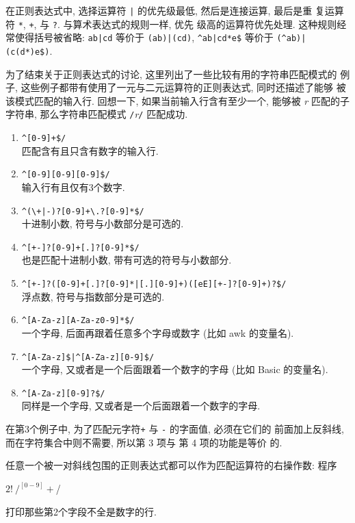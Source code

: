 在正则表达式中, 选择运算符 \verb'|' 的优先级最低, 然后是连接运算, 最后是重
复运算符 \verb'*', \verb'+', 与 \verb'?'. 与算术表达式的规则一样, 优先
级高的运算符优先处理. 这种规则经常使得括号被省略: \verb'ab|cd' 等价于
\verb'(ab)|(cd)', \verb'^ab|cd*e$' 等价于 \verb'(^ab)|(c(d*)e$)'.

为了结束关于正则表达式的讨论, 这里列出了一些比较有用的字符串匹配模式的
例子, 这些例子都带有使用了一元与二元运算符的正则表达式, 同时还描述了能够
被该模式匹配的输入行. 回想一下, 如果当前输入行含有至少一个, 能够被
\textit{r} 匹配的子字符串, 那么字符串匹配模式 \verb'/'\textit{r}\verb'/'
匹配成功.
\begin{enumerate}
\item \verb'^[0-9]+$/' \\
    匹配含有且只含有数字的输入行.
\item \verb'^[0-9][0-9][0-9]$/' \\
    输入行有且仅有3个数字.
\item \verb'^(\+|-)?[0-9]+\.?[0-9]*$/' \\
    十进制小数, 符号与小数部分是可选的.
\item \verb'^[+-]?[0-9]+[.]?[0-9]*$/' \\
    也是匹配十进制小数, 带有可选的符号与小数部分.
\item \verb'^[+-]?([0-9]+[.]?[0-9]*|[.][0-9]+)([eE][+-]?[0-9]+)?$/' \\
    浮点数, 符号与指数部分是可选的.
\item \verb'^[A-Za-z][A-Za-z0-9]*$/' \\
    一个字母, 后面再跟着任意多个字母或数字 (比如 awk 的变量名).
\item \verb'^[A-Za-z]$|^[A-Za-z][0-9]$/' \\
    一个字母, 又或者是一个后面跟着一个数字的字母 (比如 Basic 的变量名).
\item \verb'^[A-Za-z][0-9]?$/' \\
    同样是一个字母, 又或者是一个后面跟着一个数字的字母.
\end{enumerate}

在第3个例子中, 为了匹配元字符\verb'+' 与 \verb'-' 的字面值, 必须在它们的
前面加上反斜线, 而在字符集合中则不需要, 所以第 3 项与 第 4 项的功能是等价
的.

任意一个被一对斜线包围的正则表达式都可以作为匹配运算符的右操作数: 程序
\begin{awkcode}
    $2 !~ /^[0-9]+$/
\end{awkcode}
打印那些第2个字段不全是数字的行.

